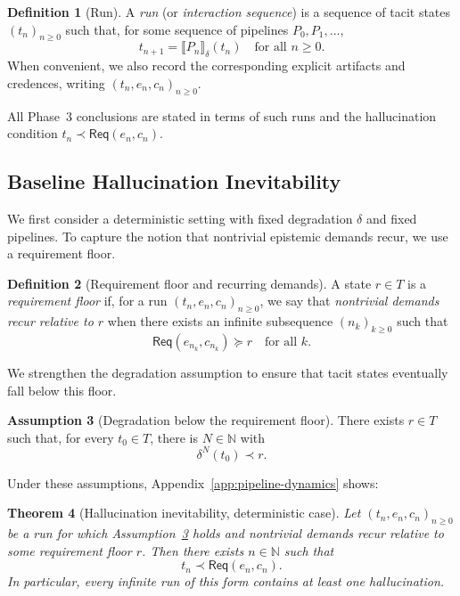 \documentclass[11pt]{article}
\newtheorem{theorem}{Theorem}[section]
\theoremstyle{definition}
\newtheorem{definition}[theorem]{Definition}
\newtheorem{assumption}[theorem]{Assumption}
\newcommand{\Req}{\mathsf{Req}}
\begin{document}
\begin{definition}[Run]
A \emph{run} (or \emph{interaction sequence}) is a sequence of tacit
states \((t_n)_{n\ge 0}\) such that, for some sequence of pipelines
\(P_0,P_1,\dots\),
\[
t_{n+1} = \llbracket P_n \rrbracket_\delta(t_n)
\quad\text{for all } n\ge 0.
\]
When convenient, we also record the corresponding explicit artifacts and
credences, writing \((t_n,e_n,c_n)_{n\ge 0}\).
\end{definition}

All Phase~3 conclusions are stated in terms of such runs and the
hallucination condition \(t_n \prec \Req(e_n,c_n)\).

\subsection{Baseline Hallucination Inevitability}

We first consider a deterministic setting with fixed degradation
\(\delta\) and fixed pipelines. To capture the notion that nontrivial
epistemic demands recur, we use a requirement floor.

\begin{definition}[Requirement floor and recurring demands]
A state \(r\in T\) is a \emph{requirement floor} if, for a run
\((t_n,e_n,c_n)_{n\ge 0}\), we say that \emph{nontrivial demands recur
relative to \(r\)} when there exists an infinite subsequence
\((n_k)_{k\ge 0}\) such that
\[
\Req(e_{n_k},c_{n_k}) \succeq r
\quad\text{for all }k.
\]
\end{definition}

We strengthen the degradation assumption to ensure that tacit states
eventually fall below this floor.

\begin{assumption}[Degradation below the requirement floor]
\label{assump:baseline-degradation-main}
There exists \(r\in T\) such that, for every \(t_0\in T\), there is
\(N\in\mathbb{N}\) with
\[
\delta^N(t_0) \prec r.
\]
\end{assumption}

Under these assumptions, Appendix~\ref{app:pipeline-dynamics} shows:

\begin{theorem}[Hallucination inevitability, deterministic case]
\label{thm:baseline-inevitability-main}
Let \((t_n,e_n,c_n)_{n\ge 0}\) be a run for which
Assumption~\ref{assump:baseline-degradation-main} holds and
nontrivial demands recur relative to some requirement floor \(r\). Then
there exists \(n\in\mathbb{N}\) such that
\[
t_n \prec \Req(e_n,c_n).
\]
In particular, every infinite run of this form contains at least one
hallucination.
\end{theorem}
\end{document}
